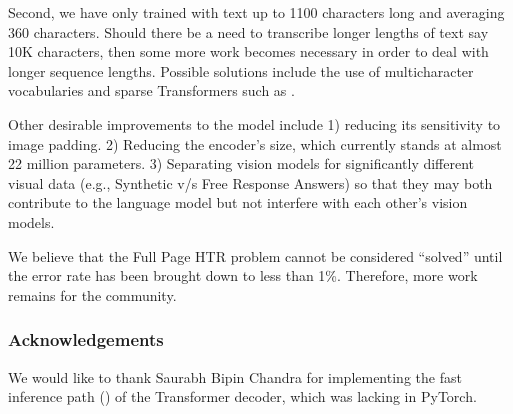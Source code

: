 \documentclass[runningheads]{llncs}
\begin{document}
Second, we have only trained with text up to 1100 characters long and averaging 360 characters. Should there be a need to transcribe longer lengths of text say 10K characters, then some more work becomes necessary in order to deal with longer sequence lengths. Possible solutions include the use of multicharacter vocabularies and sparse Transformers such as \citep{beltagy2020longformer,dai2019transformerxl}.

Other desirable improvements to the model include 1) reducing its sensitivity to image padding. 2) Reducing the encoder's size, which currently stands at almost 22 million parameters. 3) Separating vision models for significantly different visual data (e.g., Synthetic v/s Free Response Answers) so that they may both contribute to the language model but not interfere with each other's vision models.

We believe that the Full Page HTR problem cannot be considered ``solved'' until the error rate has been brought down to less than 1\%. Therefore, more work remains for the community.

\subsubsection{Acknowledgements} We would like to thank Saurabh Bipin Chandra \;for implementing the fast inference path () of the  Transformer decoder, which was lacking in PyTorch.
\end{document}
